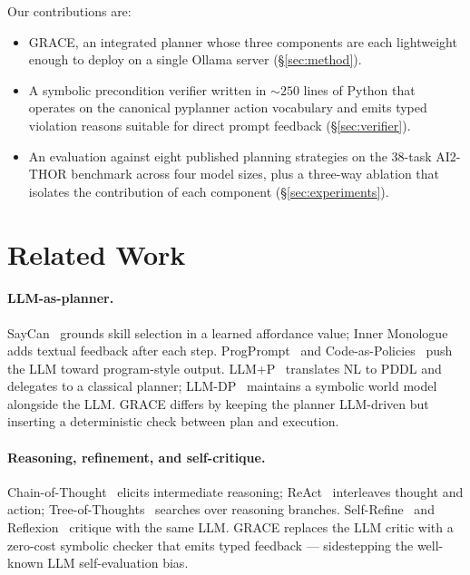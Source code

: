 Our contributions are:

\begin{itemize}
  \item GRACE, an integrated planner whose three components are
    each lightweight enough to deploy on a single Ollama server
    (\S\ref{sec:method}).
  \item A symbolic precondition verifier written in
    $\sim 250$ lines of Python that operates on the canonical
    pyplanner action vocabulary and emits typed violation reasons
    suitable for direct prompt feedback (\S\ref{sec:verifier}).
  \item An evaluation against eight published planning strategies on
    the 38-task AI2-THOR benchmark across four model sizes,
    plus a three-way ablation that isolates the contribution of each
    component (\S\ref{sec:experiments}).
\end{itemize}

\section{Related Work}\label{sec:related}

\paragraph{LLM-as-planner.}
SayCan~\cite{ahn2022saycan} grounds skill selection in a learned
affordance value; Inner Monologue~\cite{huang2022innermonologue} adds
textual feedback after each step.
ProgPrompt~\cite{singh2022progprompt} and Code-as-Policies~\cite{liang2022codeaspolicies}
push the LLM toward program-style output. LLM+P~\cite{liu2023llmp}
translates NL to PDDL and delegates to a classical planner;
LLM-DP~\cite{dagan2023llmdp} maintains a symbolic world model
alongside the LLM. GRACE differs by keeping the planner LLM-driven
but inserting a deterministic check between plan and execution.

\paragraph{Reasoning, refinement, and self-critique.}
Chain-of-Thought~\cite{wei2022cot} elicits intermediate reasoning;
ReAct~\cite{yao2022react} interleaves thought and action;
Tree-of-Thoughts~\cite{yao2023tot} searches over reasoning branches.
Self-Refine~\cite{madaan2023selfrefine} and Reflexion~\cite{shinn2023reflexion}
critique with the same LLM. GRACE replaces the LLM critic with a
zero-cost symbolic checker that emits typed feedback — sidestepping
the well-known LLM self-evaluation bias.

